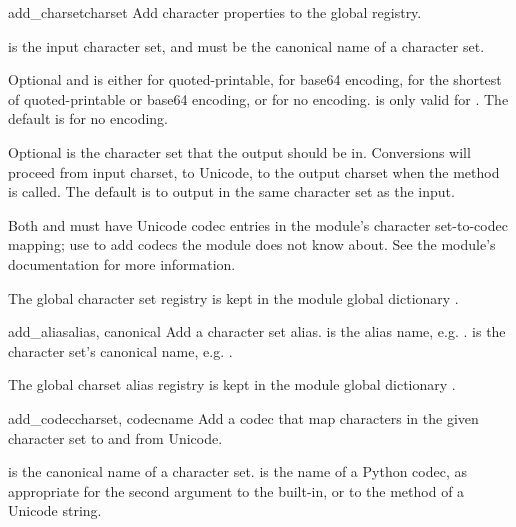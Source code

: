 \begin{funcdesc}{add_charset}{charset}
Add character properties to the global registry.

 is the input character set, and must be the canonical
name of a character set.

Optional  and  is either
 for quoted-printable,  for
base64 encoding,  for the shortest of
quoted-printable or base64 encoding, or  for no encoding.
 is only valid for . The default is
 for no encoding.

Optional  is the character set that the output
should be in.  Conversions will proceed from input charset, to
Unicode, to the output charset when the method
 is called.  The default is to output in the
same character set as the input.

Both  and  must have Unicode
codec entries in the module's character set-to-codec mapping; use
 to add codecs the module does
not know about.  See the  module's documentation for
more information.

The global character set registry is kept in the module global
dictionary .
\end{funcdesc}

\begin{funcdesc}{add_alias}{alias, canonical}
Add a character set alias.   is the alias name,
e.g. .   is the character set's canonical
name, e.g. .

The global charset alias registry is kept in the module global
dictionary .
\end{funcdesc}

\begin{funcdesc}{add_codec}{charset, codecname}
Add a codec that map characters in the given character set to and from
Unicode.

 is the canonical name of a character set.
 is the name of a Python codec, as appropriate for the
second argument to the  built-in, or to the
 method of a Unicode string.
\end{funcdesc}
